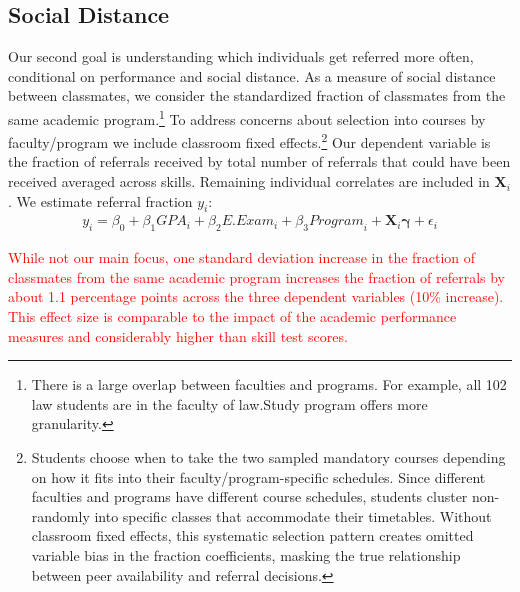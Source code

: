 \documentclass[11pt,a4paper,oneside]{article}
\begin{document}
\subsection{Social Distance}
Our second goal is understanding which individuals get referred more often, conditional on performance and social distance. As a measure of social distance between classmates, we consider the standardized fraction of classmates from the same academic program.\footnote{There is a large overlap between faculties and programs. For example, all 102 law students are in the faculty of law.Study program offers more granularity.} To address concerns about selection into courses by faculty/program we include classroom fixed effects.\footnote{Students choose when to take the two sampled mandatory courses depending on how it fits into their faculty/program-specific schedules. Since different faculties and programs have different course schedules, students cluster non-randomly into specific classes that accommodate their timetables. Without classroom fixed effects, this systematic selection pattern creates omitted variable bias in the fraction coefficients, masking the true relationship between peer availability and referral decisions.} Our dependent variable is the fraction of referrals received by total number of referrals that could have been received averaged across skills. Remaining individual correlates are included in $\mathbf{X}_{i}$. We estimate referral fraction $y_{i}$: 
\begin{multline}
    y_{i} = \beta_0 + \beta_1{GPA}_{i} + \beta_2{E.Exam}_{i} + \beta_3{Program}_{i} + \mathbf{X}_{i}\boldsymbol{\gamma} + \epsilon_{i}    
\end{multline}

\textcolor{red}{While not our main focus, one standard deviation increase in the fraction of classmates from the same academic program increases the fraction of referrals by about 1.1 percentage points across the three dependent variables (10\% increase). This effect size is comparable to the impact of the academic performance measures and considerably higher than skill test scores.}
\end{document}

